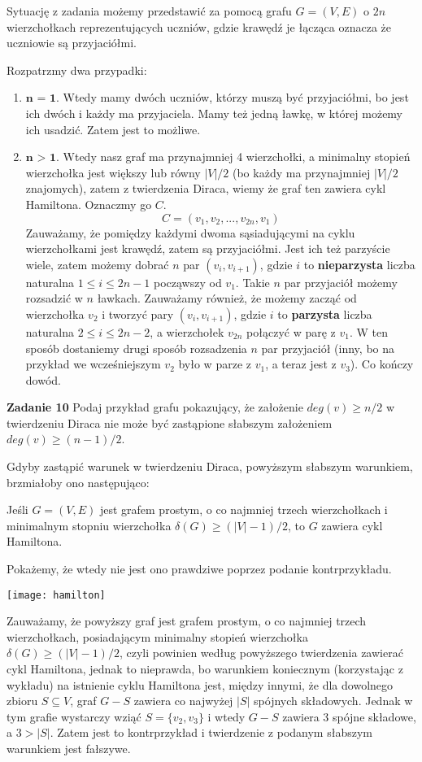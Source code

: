 \documentclass[12pt,a4paper]{article}
\begin{document}
Sytuację z zadania możemy przedstawić za pomocą grafu \(G = (V,E)\) o \(2n\) wierzchołkach reprezentujących uczniów, gdzie krawędź je łącząca oznacza że uczniowie są przyjaciółmi.

Rozpatrzmy dwa przypadki:

\begin{enumerate}
	\item \( \textbf{n = 1} \). Wtedy mamy dwóch uczniów, którzy muszą być przyjaciółmi, bo jest ich dwóch i każdy ma przyjaciela. Mamy też jedną ławkę, w której możemy ich usadzić. Zatem jest to możliwe.
	\item \( \textbf{n > 1} \). Wtedy nasz graf ma przynajmniej 4 wierzchołki, a minimalny stopień wierzchołka jest większy lub równy \(|V|/2\) (bo każdy ma przynajmniej \(|V|/2\) znajomych), zatem z twierdzenia Diraca, wiemy że graf ten zawiera cykl Hamiltona. Oznaczmy go \(C\).
	\[
		C = (v_1,v_2,...,v_{2n},v_1)
	\]
	Zauważamy, że pomiędzy każdymi dwoma sąsiadującymi na cyklu wierzchołkami jest krawędź, zatem są przyjaciółmi. Jest ich też parzyście wiele, zatem możemy dobrać \(n\) par \( (v_i, v_{i+1}) \), gdzie \(i\) to \textbf{nieparzysta} liczba naturalna \(1 \leq i \leq 2n-1\) począwszy od \(v_1\). Takie \(n\) par przyjaciół możemy rozsadzić w \(n\) ławkach.  Zauważamy również, że możemy zacząć od wierzchołka \(v_2\) i tworzyć pary \( (v_i, v_{i+1}) \), gdzie \(i\) to \textbf{parzysta} liczba naturalna \(2 \leq i \leq 2n-2\), a wierzchołek \(v_{2n}\) połączyć w parę z \(v_1\). W ten sposób dostaniemy drugi sposób rozsadzenia \(n\) par przyjaciół (inny, bo na przykład we wcześniejszym \(v_2\) było w parze z \(v_1\), a teraz jest z \(v_3\)). Co kończy dowód.
\end{enumerate}

\vskip 1cm
\noindent
\textbf{Zadanie 10} Podaj przykład grafu pokazujący, że założenie \( deg(v) \geq n/2 \) w twierdzeniu Diraca nie może być zastąpione słabszym założeniem \( deg(v) \geq (n-1)/2 \).
\vskip 0.2cm

Gdyby zastąpić warunek w twierdzeniu Diraca, powyższym słabszym warunkiem, brzmiałoby ono następująco:

Jeśli \(G=(V,E)\) jest grafem prostym, o co najmniej trzech wierzchołkach i minimalnym stopniu wierzchołka \(\delta(G) \geq (|V|-1)/2\), to \(G\) zawiera cykl Hamiltona.

Pokażemy, że wtedy nie jest ono prawdziwe poprzez podanie kontrprzykładu.
\begin{center}
	\texttt{[image: hamilton]}
\end{center}
Zauważamy, że powyższy graf jest grafem prostym, o co najmniej trzech wierzchołkach, posiadającym minimalny stopień wierzchołka \(\delta(G) \geq (|V|-1)/2\), czyli powinien według powyższego twierdzenia zawierać cykl Hamiltona, jednak to nieprawda, bo warunkiem koniecznym (korzystając z wykładu) na istnienie cyklu Hamiltona jest, między innymi, że dla dowolnego zbioru \(S \subseteq V\), graf \(G - S\) zawiera co najwyżej \( |S| \) spójnych składowych. Jednak w tym grafie wystarczy wziąć \(S = \{v_2, v_3\}\) i  wtedy \(G - S\) zawiera 3 spójne składowe, a \(3 > |S|\). Zatem jest to kontrprzykład i twierdzenie z podanym słabszym warunkiem jest fałszywe.
\end{document}
